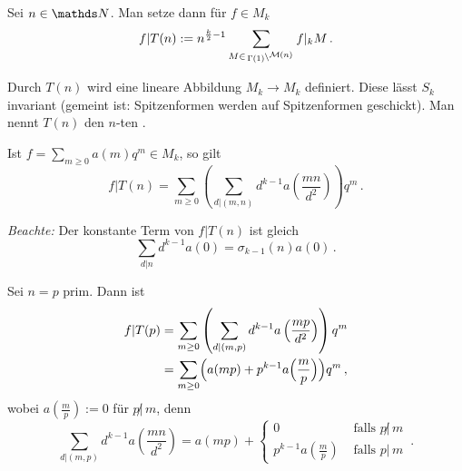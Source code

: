 \begin{defi}
Sei $n \in \NN$. Man setze dann für $f \in M_k$
\[
f | T(n) := n^{\frac k2 - 1} \sum_{M \in \linksmodulo{\Gamma(1)}{\mathcal M (n)}} f |_k M
\,.
\]
\end{defi}

\begin{satz-list}\label{TnEndoMk}
\item Durch $T(n)$ wird eine lineare Abbildung $M_k \to M_k$ definiert. Diese lässt $S_k$ invariant (gemeint ist: Spitzenformen werden auf Spitzenformen geschickt). Man nennt $T(n)$ den $n$-ten .
\item Ist $f = \sum_{m \geq 0} a(m) q^m \in M_k$, so gilt
\[
f | T(n) = \sum_{m \geq 0} \left( \sum_{d | (m,n)} d^{k-1} a\left(\frac{mn}{d^2}\right) \right) q^m
\,.
\]

\emph{Beachte:} Der konstante Term von $f | T(n)$ ist gleich
\[
\sum_{d|n} d^{k-1} a(0) = \sigma_{k-1}(n) a(0)
\,.
\]
\end{satz-list}

\begin{bsp}
Sei $n = p$ prim. Dann ist
\begin{align*}
f | T(p) &= \sum_{m \geq 0} \left( \sum_{d | (m,p)} d^{k-1} a\left(\frac{mp}{d^2}\right) \right) q^m\\
&= \sum_{m \geq 0} \Bigl( a(mp) + p^{k-1} a\Bigl( \frac mp\Bigr) \Bigr) q^m
\,,
\end{align*}
wobei $a\left(\frac mp\right) := 0$ für $p \!\! \not | \, m$, denn
\[
\sum_{d | (m,p)} d^{k-1} a \left( \frac {mn}{d^2} \right) = a(mp) + 
\begin{cases}
0 & \text{ falls } p \!\! \not | \, m\\ 
p^{k-1} a \left(\frac mp \right) & \text{ falls } p | \, m
\end{cases}
\,.
\]
\end{bsp}


